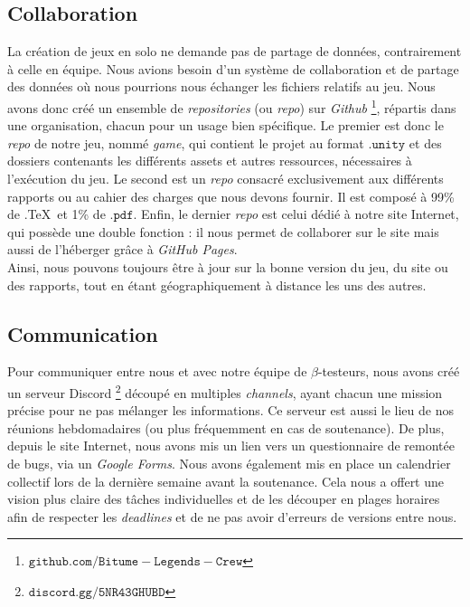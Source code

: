 \documentclass[a4paper,12pt]{article}
\begin{document}
        \subsection{Collaboration}
            La création de jeux en solo ne demande pas de partage de données, contrairement 
            à celle en équipe. Nous avions besoin d'un système de collaboration et de partage des données où nous 
            pourrions nous échanger les fichiers relatifs au jeu. 
            Nous avons donc créé un ensemble de \textit{repositories} (ou \textit{repo}) sur \textsl{Github}
            \footnote{\(\mathtt{github.com/Bitume-Legends-Crew}\)}, répartis dans une organisation,
            chacun pour un usage bien spécifique. Le premier est donc le \textit{repo} de
            notre jeu, nommé \textit{game}, qui contient le projet au format \(\mathtt{.unity}\)
            et des dossiers contenants les différents assets et autres ressources,
            nécessaires à l'exécution du jeu. 
            Le second est un \textit{repo} consacré exclusivement aux différents rapports ou au cahier des charges
            que nous devons fournir. Il est composé à 99\% de .\TeX\, et 1\% de \(\mathtt{.pdf}\).
            Enfin, le dernier \textit{repo} est celui dédié à notre site Internet, qui
            possède une double fonction : il nous permet de collaborer sur le site
            mais aussi de l'héberger grâce à \textsl{GitHub Pages}.\\
            \indent Ainsi, nous pouvons toujours être à jour sur la bonne version du jeu,
            du site ou des rapports, tout en étant géographiquement à distance les uns 
            des autres.

        \subsection{Communication}
            Pour communiquer entre nous et avec notre équipe de \(\beta\)-testeurs, nous
            avons créé un serveur Discord \footnote{\(\mathtt{discord.gg/5NR43GHUBD}\)}
            découpé en multiples 
            \textit{channels}, ayant chacun une mission précise pour ne pas mélanger les
            informations. Ce serveur est aussi le lieu de nos réunions hebdomadaires 
            (ou plus fréquemment en cas de soutenance). De plus, depuis le site Internet, nous
            avons mis un lien vers un questionnaire de remontée de bugs, via un \textsl{Google Forms}.
            Nous avons également mis en place un calendrier collectif lors de la
            dernière semaine avant la soutenance. Cela nous a offert une vision plus
            claire des tâches individuelles et de les découper en plages horaires afin de 
            respecter les \textit{deadlines} et de ne pas avoir d'erreurs de versions
            entre nous.
\end{document}
